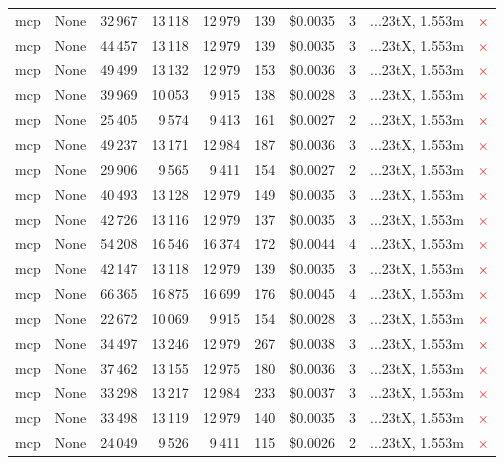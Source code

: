 \documentclass[a4paper,11pt]{article}
\begin{document}
\begin{table}[H]
{\begin{tabular}{l r r r r r r r l c}
mcp & None & 32\,967 & 13\,118 & 12\,979 & 139 & \$0.0035 & 3 & ...23tX, 1.553m & \textcolor{red}{\(\times\)} \\
mcp & None & 44\,457 & 13\,118 & 12\,979 & 139 & \$0.0035 & 3 & ...23tX, 1.553m & \textcolor{red}{\(\times\)} \\
mcp & None & 49\,499 & 13\,132 & 12\,979 & 153 & \$0.0036 & 3 & ...23tX, 1.553m & \textcolor{red}{\(\times\)} \\
mcp & None & 39\,969 & 10\,053 & 9\,915 & 138 & \$0.0028 & 3 & ...23tX, 1.553m & \textcolor{red}{\(\times\)} \\
mcp & None & 25\,405 & 9\,574 & 9\,413 & 161 & \$0.0027 & 2 & ...23tX, 1.553m & \textcolor{red}{\(\times\)} \\
mcp & None & 49\,237 & 13\,171 & 12\,984 & 187 & \$0.0036 & 3 & ...23tX, 1.553m & \textcolor{red}{\(\times\)} \\
mcp & None & 29\,906 & 9\,565 & 9\,411 & 154 & \$0.0027 & 2 & ...23tX, 1.553m & \textcolor{red}{\(\times\)} \\
mcp & None & 40\,493 & 13\,128 & 12\,979 & 149 & \$0.0035 & 3 & ...23tX, 1.553m & \textcolor{red}{\(\times\)} \\
mcp & None & 42\,726 & 13\,116 & 12\,979 & 137 & \$0.0035 & 3 & ...23tX, 1.553m & \textcolor{red}{\(\times\)} \\
mcp & None & 54\,208 & 16\,546 & 16\,374 & 172 & \$0.0044 & 4 & ...23tX, 1.553m & \textcolor{red}{\(\times\)} \\
mcp & None & 42\,147 & 13\,118 & 12\,979 & 139 & \$0.0035 & 3 & ...23tX, 1.553m & \textcolor{red}{\(\times\)} \\
mcp & None & 66\,365 & 16\,875 & 16\,699 & 176 & \$0.0045 & 4 & ...23tX, 1.553m & \textcolor{red}{\(\times\)} \\
mcp & None & 22\,672 & 10\,069 & 9\,915 & 154 & \$0.0028 & 3 & ...23tX, 1.553m & \textcolor{red}{\(\times\)} \\
mcp & None & 34\,497 & 13\,246 & 12\,979 & 267 & \$0.0038 & 3 & ...23tX, 1.553m & \textcolor{red}{\(\times\)} \\
mcp & None & 37\,462 & 13\,155 & 12\,975 & 180 & \$0.0036 & 3 & ...23tX, 1.553m & \textcolor{red}{\(\times\)} \\
mcp & None & 33\,298 & 13\,217 & 12\,984 & 233 & \$0.0037 & 3 & ...23tX, 1.553m & \textcolor{red}{\(\times\)} \\
mcp & None & 33\,498 & 13\,119 & 12\,979 & 140 & \$0.0035 & 3 & ...23tX, 1.553m & \textcolor{red}{\(\times\)} \\
mcp & None & 24\,049 & 9\,526 & 9\,411 & 115 & \$0.0026 & 2 & ...23tX, 1.553m & \textcolor{red}{\(\times\)} \\

\end{tabular}}
\end{table}
\end{document}
